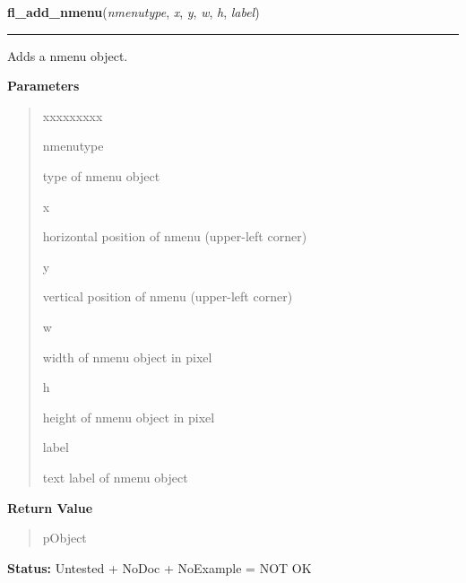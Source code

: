     \label{xformslib:library:fl_add_nmenu}

    \vspace{0.5ex}

\hspace{.8\funcindent}\begin{boxedminipage}{\funcwidth}

    \raggedright \textbf{fl\_add\_nmenu}(\textit{nmenutype}, \textit{x}, \textit{y}, \textit{w}, \textit{h}, \textit{label})

    \vspace{-1.5ex}

    \rule{\textwidth}{0.5\fboxrule}
\setlength{\parskip}{2ex}
    Adds a nmenu object.

\setlength{\parskip}{1ex}
      \textbf{Parameters}
      \vspace{-1ex}

      \begin{quote}
        \begin{Ventry}{xxxxxxxxx}

          \item[nmenutype]

          type of nmenu object

          \item[x]

          horizontal position of nmenu (upper-left corner)

          \item[y]

          vertical position of nmenu (upper-left corner)

          \item[w]

          width of nmenu object in pixel

          \item[h]

          height of nmenu object in pixel

          \item[label]

          text label of nmenu object

        \end{Ventry}

      \end{quote}

      \textbf{Return Value}
    \vspace{-1ex}

      \begin{quote}
      pObject

      \end{quote}

\textbf{Status:} Untested + NoDoc + NoExample = NOT OK



    \end{boxedminipage}

